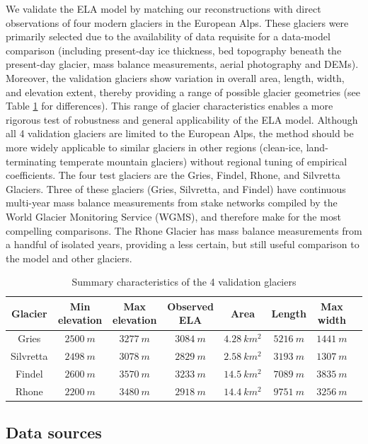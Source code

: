 \documentclass[review]{elsarticle}
\begin{document}
We validate the ELA model by matching our reconstructions with direct observations of four modern glaciers in the European Alps.
These glaciers were primarily selected due to the availability of data requisite for a data-model comparison (including present-day ice thickness, bed topography beneath the present-day glacier, mass balance measurements, aerial photography and DEMs).
Moreover, the validation glaciers show variation in overall area, length, width, and elevation extent, thereby providing a range of possible glacier geometries (see Table \ref{tab:attrs} for differences).
This range of glacier characteristics enables a more rigorous test of robustness and general applicability of the ELA model.
Although all 4 validation glaciers are limited to the European Alps, the method should be more widely applicable to similar glaciers in other regions (clean-ice, land-terminating temperate mountain glaciers) without regional tuning of empirical coefficients.
The four test glaciers are the Gries, Findel, Rhone, and Silvretta Glaciers.
Three of these glaciers (Gries, Silvretta, and Findel) have continuous multi-year mass balance measurements from stake networks compiled by the World Glacier Monitoring Service (WGMS), and therefore make for the most compelling comparisons.
The Rhone Glacier has mass balance measurements from a handful of isolated years, providing a less certain, but still useful comparison to the model and other glaciers.

\begin{table}[]
    \centering
    \begin{tabular}{c|c|c|c|c|c|c|c}
        Glacier & Min elevation & Max elevation & Observed ELA & Area & Length & Max width \\
        \hline
        Gries & $2500\:m$ & $3277\:m$ & $3084\:m$ & $4.28\:km^2$ & $5216\:m$ & $1441\:m$ \\
        Silvretta & $2498\:m$ & $3078\:m$ & $2829\:m$ & $2.58\:km^2$ & $3193\:m$ & $1307\:m$ \\
        Findel & $2600\:m$ & $3570\:m$ & $3233\:m$ & $14.5\:km^2$ & $7089\:m$ & $3835\:m$ \\
        Rhone & $2200\:m$ & $3480\:m$ & $2918\:m$ & $14.4\:km^2$ & $9751\:m$ & $3256\:m$ \\
    \end{tabular}
    \caption{Summary characteristics of the 4 validation glaciers}
    \label{tab:attrs}
\end{table}

\subsection{Data sources}
\end{document}
